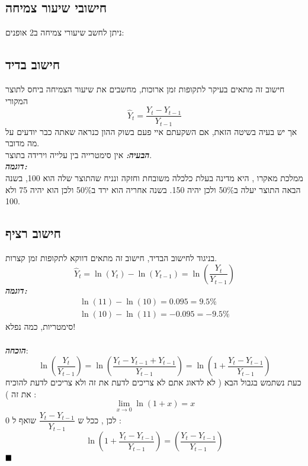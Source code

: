 \documentclass[a4paper,12pt]{article}
\renewcommand{\qed}{\hfill\blacksquare}
\begin{document}
\begin{RTL}
\begin{hebrew}
\section{חישובי שיעור צמיחה}
ניתן לחשב שיעורי צמיחה ב2 אופנים:
\subsection{חישוב בדיד}
חישוב זה מתאים בעיקר לתקופות זמן ארוכות, מחשבים את שיעור הצמיחה ביחס לתוצר המקורי
\begin{equation*}
    \hat Y_t = \frac{Y_t - Y_{t-1}}{Y_{t-1}}
\end{equation*}
אך יש בעיה בשיטה הזאת, אם השקעתם איי פעם בשוק ההון כנראה שאתה כבר יודעים על מה מדובר.
\\
\textbf{\textit{הבעיה:}} אין סימטרייה בין עלייה וירידה בתוצר. \\
\textbf{\textit{דוגמה:}} \\
ממלכת מאקרו , היא מדינה בעלת כלכלה משובחת וחזקה ונניח שהתוצר שלה הוא 100, בשנה הבאה התוצר יעלה ב50\% ולכן יהיה 150. בשנה אחריה הוא ירד ב50\% ולכן הוא יהיה 75 ולא 100.
\subsection{חישוב רציף}
בניגוד לחישוב הבדיד, חישוב זה מתאים דווקא לתקופות זמן קצרות.
\begin{equation*}
    \hat Y_t = \ln (Y_t) - \ln (Y_{t-1}) = \ln \left(\frac{Y_t}{Y_{t-1}}\right)
\end{equation*}
\textbf{\textit{דוגמה:}} \\
\begin{align*}
    \ln(11) - \ln(10) = 0.095 = 9.5\% \\
    \ln(10) - \ln(11) = -0.095 = -9.5\%
\end{align*}
סימטריות, כמה נפלא!\\
\\
\textbf{\textit{הוכחה}}:
\begin{equation*}
    \ln \left (\frac{Y_t}{Y_{t-1}} \right ) = 
    \ln \left (\frac{Y_t -Y_{t-1} + Y_{t-1}}{Y_{t-1}} \right ) = 
    \ln \left (1 + \frac{Y_t - Y_{t-1}}{Y_{t-1}} \right)
\end{equation*}
כעת נשתמש בגבול הבא ( לא לדאוג אתם לא צריכים לדעת את זה ולא צריכים לדעת להוכיח את זה ) :
\begin{equation*}
    \lim_{x \to 0} \ln (1+x) = x
\end{equation*}
לכן , ככל ש $ \dfrac{Y_t - Y_{t-1}}{Y_{t-1}}$ שואף ל 0 :
$$\ln \left (1 + \dfrac{Y_t - Y_{t-1}}{Y_{t-1}} \right) = \left (\dfrac{Y_t - Y_{t-1}}{Y_{t-1}} \right)$$
$\qed$
\newpage


\end{hebrew}
\end{RTL}
\end{document}
